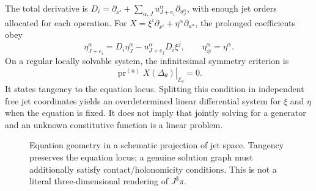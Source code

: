 \documentclass[11pt,a4paper,oneside]{report}
\numberwithin{equation}{chapter}
\newcommand{\E}{\mathcal E}
\newcommand{\pr}{\operatorname{pr}}
\begin{document}
The total derivative is $D_i=\partial_{x^i}+\sum_{\alpha,J}u^\alpha_{J+e_i}\partial_{u^\alpha_J}$, with enough jet orders allocated for each operation. For $X=\xi^i\partial_{x^i}+\eta^\alpha\partial_{u^\alpha}$, the prolonged coefficients obey
\begin{equation}\label{eq:prolong}
\eta^\alpha_{J+e_i}=D_i\eta^\alpha_J-u^\alpha_{J+e_j}D_i\xi^j,
\qquad \eta^\alpha_\varnothing=\eta^\alpha.
\end{equation}
On a regular locally solvable system, the infinitesimal symmetry criterion is \cite{olver1986,oliveri2026}
\begin{equation}\label{eq:criterion}
\left.\pr^{(n)}X(\Delta_\theta)\right|_{\E_\theta}=0.
\end{equation}
It states tangency to the equation locus. Splitting this condition in independent free jet coordinates yields an overdetermined linear differential system for $\xi$ and $\eta$ when the equation is fixed. It does not imply that jointly solving for a generator and an unknown constitutive function is a linear problem.

\begin{figure}[htbp]\centering
{}
\caption{Equation geometry in a schematic projection of jet space. Tangency preserves the equation locus; a genuine solution graph must additionally satisfy contact/holonomicity conditions. This is not a literal three-dimensional rendering of $J^3\pi$.}\label{fig:jet}
\end{figure}
\end{document}
